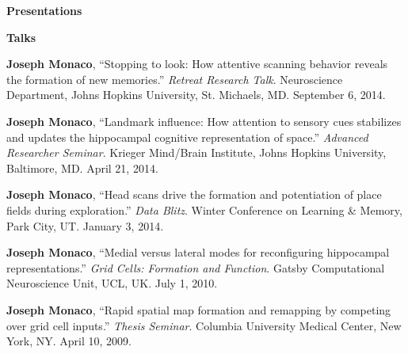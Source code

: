 \documentclass[10pt]{article}
\begin{document}
\pagebreak
{\large \textbf{Presentations}}

\begin{description}
\item \textbf{Talks}
\item[\quad] \textbf{Joseph Monaco}, ``Stopping to look: How attentive scanning behavior reveals the formation of new memories.'' \emph{Retreat Research Talk}. Neuroscience Department, Johns Hopkins University, St. Michaels, MD. September 6, 2014.
\item[\quad] \textbf{Joseph Monaco}, ``Landmark influence: How attention to sensory cues stabilizes and updates the hippocampal cognitive representation of space.'' \emph{Advanced Researcher Seminar}. Krieger Mind/Brain Institute, Johns Hopkins University, Baltimore, MD. April 21, 2014.
\item[\quad] \textbf{Joseph Monaco}, ``Head scans drive the formation and potentiation of place fields during exploration.'' \emph{Data Blitz}. Winter Conference on Learning \& Memory, Park City, UT. January 3, 2014.
\item[\quad] \textbf{Joseph Monaco}, ``Medial versus lateral modes for reconfiguring hippocampal representations.'' \emph{Grid Cells: Formation and Function}. Gatsby Computational Neuroscience Unit, UCL, UK. July 1, 2010.
\item[\quad] \textbf{Joseph Monaco}, ``Rapid spatial map formation and remapping by competing over grid cell inputs.'' \emph{Thesis Seminar}. Columbia University Medical Center, New York, NY. April 10, 2009.
\end{description}
\end{document}

